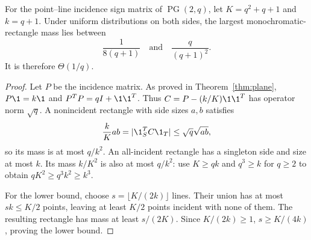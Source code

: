 \begin{proposition}\label{prop:pg-rect}
For the point--line incidence sign matrix of $\operatorname{PG}(2,q)$, let $K=q^2+q+1$ and $k=q+1$. Under uniform distributions on both sides, the largest monochromatic-rectangle mass lies between
\[
 \frac1{8(q+1)}\quad\text{and}\quad\frac{q}{(q+1)^2}.
\]
It is therefore $\Theta(1/q)$.
\end{proposition}

\begin{proof}
Let $P$ be the incidence matrix. As proved in Theorem~\ref{thm:plane}, $P\1=k\1$ and $P^TP=qI+\1\1^T$. Thus $C=P-(k/K)\1\1^T$ has operator norm $\sqrt q$. A nonincident rectangle with side sizes $a,b$ satisfies
\[
 \frac{k}{K}ab=|\1_S^TC\1_T|\le\sqrt q\sqrt{ab},
\]
so its mass is at most $q/k^2$. An all-incident rectangle has a singleton side and size at most $k$. Its mass $k/K^2$ is also at most $q/k^2$: use $K\ge qk$ and $q^3\ge k$ for $q\ge2$ to obtain $qK^2\ge q^3k^2\ge k^3$.

For the lower bound, choose $s=\lfloor K/(2k)\rfloor$ lines. Their union has at most $sk\le K/2$ points, leaving at least $K/2$ points incident with none of them. The resulting rectangle has mass at least $s/(2K)$. Since $K/(2k)\ge1$, $s\ge K/(4k)$, proving the lower bound.
\end{proof}
